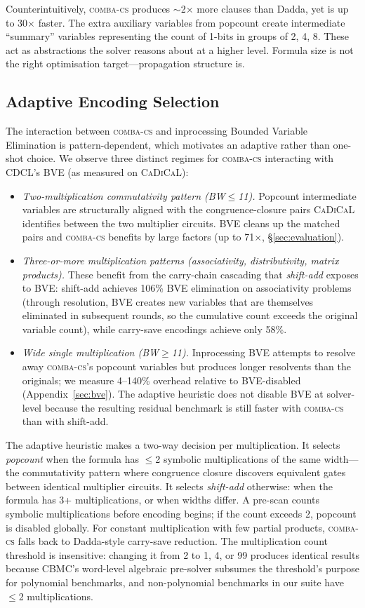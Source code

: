\documentclass[a4paper]{ceurart}
\newcommand{\combacs}{\textsc{comba-cs}\xspace}
\newcommand{\cadical}{\textsc{CaDiCaL}\xspace}
\begin{document}
Counterintuitively, \combacs produces ${\sim}$2$\times$ more clauses
than Dadda, yet is up to 30$\times$ faster. The extra auxiliary
variables from popcount create intermediate ``summary'' variables
representing the count of 1-bits in groups of 2, 4, 8. These act as
abstractions the solver reasons about at a higher level. Formula size
is not the right optimisation target---propagation structure is.

\subsection{Adaptive Encoding Selection}

The interaction between \combacs and inprocessing Bounded Variable
Elimination is pattern-dependent, which motivates an adaptive
rather than one-shot choice. We observe three distinct regimes
for \combacs interacting with CDCL's BVE (as measured on
\cadical):
\begin{itemize}
\item \emph{Two-multiplication commutativity pattern (BW$\leq$11).}
Popcount intermediate variables are structurally aligned with
the congruence-closure pairs \cadical identifies between the
two multiplier circuits. BVE cleans up the matched pairs and
\combacs benefits by large factors (up to 71$\times$, §\ref{sec:evaluation}).
\item \emph{Three-or-more multiplication patterns (associativity,
distributivity, matrix products).} These benefit from the
carry-chain cascading that \emph{shift-add} exposes to BVE:
shift-add achieves 106\% BVE elimination on associativity problems
(through resolution, BVE creates new variables that are themselves
eliminated in subsequent rounds, so the cumulative count exceeds
the original variable count), while carry-save encodings achieve
only 58\%.
\item \emph{Wide single multiplication (BW$\geq$11).}
Inprocessing BVE attempts to resolve away \combacs's popcount
variables but produces longer resolvents than the originals; we
measure 4--140\% overhead relative to BVE-disabled (Appendix~\ref{sec:bve}).
The adaptive heuristic does not disable BVE at solver-level
because the resulting residual benchmark is still faster with
\combacs than with shift-add.
\end{itemize}

The adaptive heuristic makes a two-way decision per multiplication.
It selects \emph{popcount} when the formula has $\leq$2 symbolic
multiplications of the same width---the commutativity pattern where
congruence closure discovers equivalent gates between identical
multiplier circuits. It selects \emph{shift-add} otherwise: when the
formula has 3+ multiplications, or when widths differ. A pre-scan
counts symbolic multiplications before encoding begins; if the count
exceeds 2, popcount is disabled globally. For constant multiplication
with few partial products, \combacs falls back to Dadda-style
carry-save reduction. The multiplication count threshold is
insensitive: changing it from 2 to 1, 4, or 99 produces identical
results because CBMC's word-level algebraic pre-solver subsumes
the threshold's purpose for polynomial benchmarks, and
non-polynomial benchmarks in our suite have $\leq$2 multiplications.
\end{document}
